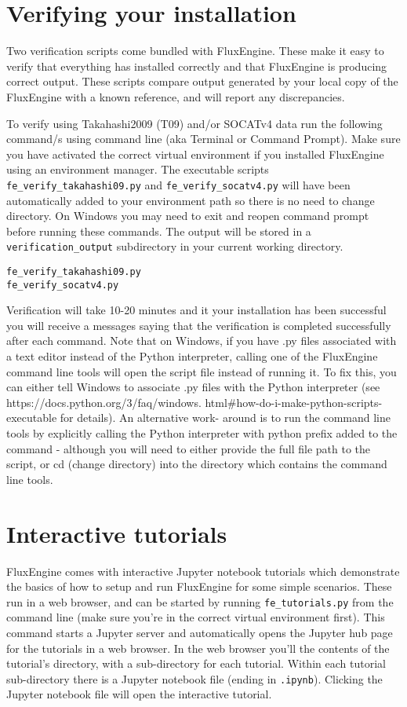 \documentclass[]{scrartcl}
\begin{document}
\section{Verifying your installation} \label{verifying_fluxengine}
Two verification scripts come bundled with FluxEngine. These make it easy to verify that everything has installed correctly and that FluxEngine is producing correct output. These scripts compare output generated by your local copy of the FluxEngine with a known reference, and will report any discrepancies.

To verify using Takahashi2009 (T09) and/or SOCATv4 data run the following command/s using command line (aka Terminal or Command Prompt). Make sure you have activated the correct virtual environment if you installed FluxEngine using an environment manager. The executable scripts \texttt{fe\_verify\_takahashi09.py} and \texttt{fe\_verify\_socatv4.py} will have been automatically added to your environment path so there is no need to change directory. On Windows you may need to exit and reopen command prompt before running these commands. The output will be stored in a \texttt{verification\_output} subdirectory in your current working directory.
\begin{lstlisting}
fe_verify_takahashi09.py
fe_verify_socatv4.py
\end{lstlisting}

Verification will take 10-20 minutes and it your installation has been successful you will receive a messages saying that the verification is completed successfully after each command. Note that on Windows, if you have .py files associated with a text editor instead of the Python interpreter, calling one of the FluxEngine command line tools will open the
script file instead of running it. To fix this, you can either tell Windows to associate
.py files with the Python interpreter (see {https://docs.python.org/3/faq/windows.
html\#how-do-i-make-python-scripts-executable} for details). An alternative work-
around is to run the command line tools by explicitly calling the Python interpreter with
python prefix added to the command - although you will need to either provide the full
file path to the script, or cd (change directory) into the directory which contains
the command line tools.


\section{Interactive tutorials}
FluxEngine comes with interactive Jupyter notebook tutorials which demonstrate the basics of how to setup and run FluxEngine for some simple scenarios. These run in a web browser, and can be started by running \texttt{fe\_tutorials.py} from the command line (make sure you're in the correct virtual environment first). This command starts a Jupyter server and automatically opens the Jupyter hub page for the tutorials in a web browser. In the web browser you'll the contents of the tutorial's directory, with a sub-directory for each tutorial. Within each tutorial sub-directory there is a Jupyter notebook file (ending in \texttt{.ipynb}). Clicking the Jupyter notebook file will open the interactive tutorial.
\end{document}
